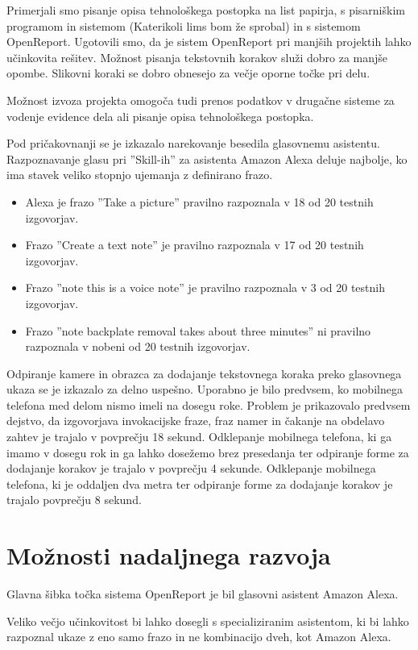 \documentclass[a4paper, 12pt]{book}
\begin{document}
Primerjali smo pisanje opisa tehnološkega postopka na list papirja, s pisarniškim programom in sistemom (Katerikoli lims bom že sprobal) in s sistemom OpenReport.
Ugotovili smo, da je sistem OpenReport pri manjših projektih lahko učinkovita rešitev.
Možnost pisanja tekstovnih korakov služi dobro za manjše opombe.
Slikovni koraki se dobro obnesejo za večje oporne točke pri delu.

Možnost izvoza projekta omogoča tudi prenos podatkov v drugačne sisteme za vodenje evidence dela ali pisanje opisa tehnološkega postopka.

Pod pričakovnanji se je izkazalo narekovanje besedila glasovnemu asistentu.
Razpoznavanje glasu pri ''Skill-ih'' za asistenta Amazon Alexa deluje najbolje, ko ima stavek veliko stopnjo ujemanja z definirano frazo.
\begin{itemize}
	\item Alexa je frazo ''Take a picture'' pravilno razpoznala v 18 od 20 testnih izgovorjav.
	\item Frazo ''Create a text note'' je pravilno razpoznala v 17 od 20 testnih izgovorjav.
	\item Frazo ''note this is a voice note'' je pravilno razpoznala v 3 od 20 testnih izgovorjav.
	\item Frazo ''note backplate removal takes about three minutes'' ni pravilno razpoznala v nobeni od 20 testnih izgovorjav.
\end{itemize}

Odpiranje kamere in obrazca za dodajanje tekstovnega koraka preko glasovnega ukaza se je izkazalo za delno uspešno.
Uporabno je bilo predvsem, ko mobilnega telefona med delom nismo imeli na dosegu roke.
Problem je prikazovalo predvsem dejstvo, da izgovorjava invokacijske fraze, fraz namer in čakanje na obdelavo zahtev je trajalo v povprečju 18 sekund.
Odklepanje mobilnega telefona, ki ga imamo v dosegu rok in ga lahko dosežemo brez presedanja ter odpiranje forme za dodajanje korakov je trajalo v povprečju 4 sekunde.
Odklepanje mobilnega telefona, ki je oddaljen dva metra ter odpiranje forme za dodajanje korakov je trajalo povprečju 8 sekund.

\chapter{Možnosti nadaljnega razvoja}

Glavna šibka točka sistema OpenReport je bil glasovni asistent Amazon Alexa.

Veliko večjo učinkovitost bi lahko dosegli s specializiranim asistentom, ki bi lahko razpoznal ukaze z eno samo frazo in ne kombinacijo dveh, kot Amazon Alexa.
\end{document}
